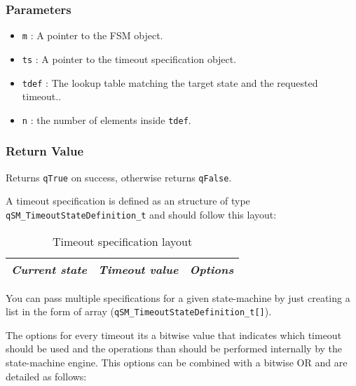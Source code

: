 \subsubsection*{Parameters}
\begin{itemize}
    \item \lstinline{m} : A pointer to the FSM object. 
    \item \lstinline{ts} : A pointer to the timeout specification object.
    \item \lstinline{tdef} : The lookup table matching the target state and the requested timeout..
    \item \lstinline{n} : the number of elements inside \lstinline{tdef}.
\end{itemize}

\subsubsection*{Return Value}
Returns \lstinline{qTrue} on success, otherwise returns \lstinline{qFalse}.

\hrulefill

A timeout specification is defined as an structure of type \lstinline{qSM_TimeoutStateDefinition_t} and should follow this layout:

\begin{table}[H]
\centering
\begin{tabular}{||c c c||} 
 \hline
 \textit{Current state} & \textit{Timeout value} & \textit{Options} \\ [0.5ex] 
 \hline
\end{tabular}
\caption{Timeout specification layout}
\label{timeoutspec_table_layout}
\end{table}

You can pass multiple specifications for a given state-machine by just creating a list in the form of array (\lstinline{qSM_TimeoutStateDefinition_t[]}).

The options for every timeout its a bitwise value that indicates which timeout should be used and the operations than should be performed internally by the state-machine engine. This options can be combined with a bitwise OR and are detailed as follows:

